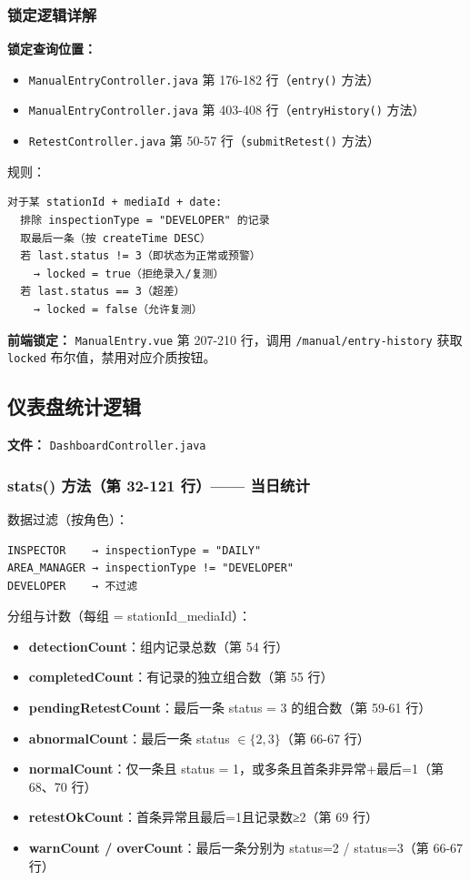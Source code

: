 \documentclass[12pt,a4paper]{ctexart}
\begin{document}
\subsubsection{锁定逻辑详解}

\textbf{锁定查询位置：}
\begin{itemize}
    \item \texttt{ManualEntryController.java} 第 176-182 行（\texttt{entry()} 方法）
    \item \texttt{ManualEntryController.java} 第 403-408 行（\texttt{entryHistory()} 方法）
    \item \texttt{RetestController.java} 第 50-57 行（\texttt{submitRetest()} 方法）
\end{itemize}

规则：
\begin{verbatim}
对于某 stationId + mediaId + date:
  排除 inspectionType = "DEVELOPER" 的记录
  取最后一条（按 createTime DESC）
  若 last.status != 3（即状态为正常或预警）
    → locked = true（拒绝录入/复测）
  若 last.status == 3（超差）
    → locked = false（允许复测）
\end{verbatim}

\textbf{前端锁定：} \texttt{ManualEntry.vue} 第 207-210 行，调用 \texttt{/manual/entry-history} 获取 \texttt{locked} 布尔值，禁用对应介质按钮。

\subsection{仪表盘统计逻辑}

\textbf{文件：} \texttt{DashboardController.java}

\subsubsection{stats() 方法（第 32-121 行）—— 当日统计}

数据过滤（按角色）：
\begin{verbatim}
INSPECTOR    → inspectionType = "DAILY"
AREA_MANAGER → inspectionType != "DEVELOPER"
DEVELOPER    → 不过滤
\end{verbatim}

分组与计数（每组 = stationId\_mediaId）：
\begin{itemize}
    \item \textbf{detectionCount}：组内记录总数（第 54 行）
    \item \textbf{completedCount}：有记录的独立组合数（第 55 行）
    \item \textbf{pendingRetestCount}：最后一条 status = 3 的组合数（第 59-61 行）
    \item \textbf{abnormalCount}：最后一条 status $\in \{2, 3\}$（第 66-67 行）
    \item \textbf{normalCount}：仅一条且 status = 1，或多条且首条非异常+最后=1（第 68、70 行）
    \item \textbf{retestOkCount}：首条异常且最后=1且记录数≥2（第 69 行）
    \item \textbf{warnCount / overCount}：最后一条分别为 status=2 / status=3（第 66-67 行）
\end{itemize}
\end{document}
